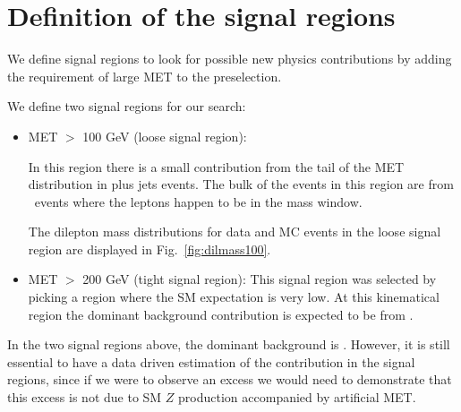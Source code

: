 \section{Definition of the signal regions}
\label{sec:sigregion}

We define signal regions to look for possible
new physics contributions by adding the requirement of large MET to the preselection. 

We define two signal regions for our search:
\begin{itemize}
\item MET $>$ 100 GeV (loose signal region):

In this region there is a small contribution from the tail of the MET distribution 
in \Z plus jets events. 
The bulk of the events in this region are from \ttbar\ events where the leptons happen to be in the \Z 
mass window.

The dilepton mass distributions for data and MC events in the loose signal region are displayed in Fig.~\ref{fig:dilmass100}.

\item MET $>$ 200 GeV (tight signal region):
This signal region was selected by picking a region where the SM expectation is very low.
At this kinematical region the dominant background contribution is expected to be from \ttbar.

\end{itemize}

In the two signal regions above, the dominant background is \ttbar. 
However, it is still essential to have a data driven estimation of the \Z contribution
in the signal regions, since if we were to observe an excess we would need to demonstrate
that this excess is not due to SM $Z$ production accompanied by artificial MET.

